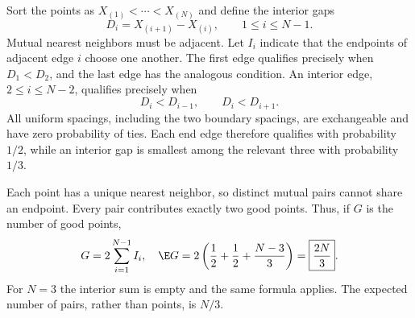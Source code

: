 Sort the points as $X_{(1)}<\cdots<X_{(N)}$ and define the interior gaps
\[
D_i=X_{(i+1)}-X_{(i)},\qquad 1\le i\le N-1.
\]
Mutual nearest neighbors must be adjacent. Let $I_i$ indicate that the endpoints of adjacent edge $i$ choose one another. The first edge qualifies precisely when $D_1<D_2$, and the last edge has the analogous condition. An interior edge, $2\le i\le N-2$, qualifies precisely when
\[
D_i<D_{i-1},\qquad D_i<D_{i+1}.
\]
All uniform spacings, including the two boundary spacings, are exchangeable and have zero probability of ties. Each end edge therefore qualifies with probability $1/2$, while an interior gap is smallest among the relevant three with probability $1/3$.

Each point has a unique nearest neighbor, so distinct mutual pairs cannot share an endpoint. Every pair contributes exactly two good points. Thus, if $G$ is the number of good points,
\[
G=2\sum_{i=1}^{N-1}I_i,
\quad
\E G=2\left(\frac12+\frac12+\frac{N-3}{3}\right)
=\boxed{\frac{2N}{3}}.
\]
For $N=3$ the interior sum is empty and the same formula applies. The expected number of pairs, rather than points, is $N/3$.
